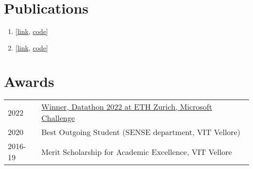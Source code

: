 \documentclass[]{onepage}
\begin{document}
\begin{minipage}[t]{0.66\textwidth}

\section{Publications}

\renewcommand*\labelenumi{[\theenumi]}
\begin{enumerate}
    \item {} [\href{https://arxiv.org/abs/2207.05843}{link}, \href{https://github.com/Siddhant-Ray/Network-Traffic-Transformer}{code}]
    \item {} [\href{https://www.inderscienceonline.com/doi/abs/10.1504/IJMNDI.2020.112622}{link}, \href{https://github.com/Siddhant-Ray/Machine-Learning-Based-Cell-Association}{code}]
\end{enumerate}

\vspace{-0.1cm}
\section{Awards} 
\begin{tabular}{ll}
2022         & \href{https://github.com/FatjonZOGAJ/multilingual-text-analytics}{Winner, Datathon 2022 at ETH Zurich, Microsoft Challenge}\\
2020	     &  Best Outgoing Student (SENSE department, VIT Vellore)\\
2016-19      & Merit Scholarship for Academic Excellence, VIT Vellore
\end{tabular}
\sectionsep

\end{minipage} 
\end{document}
